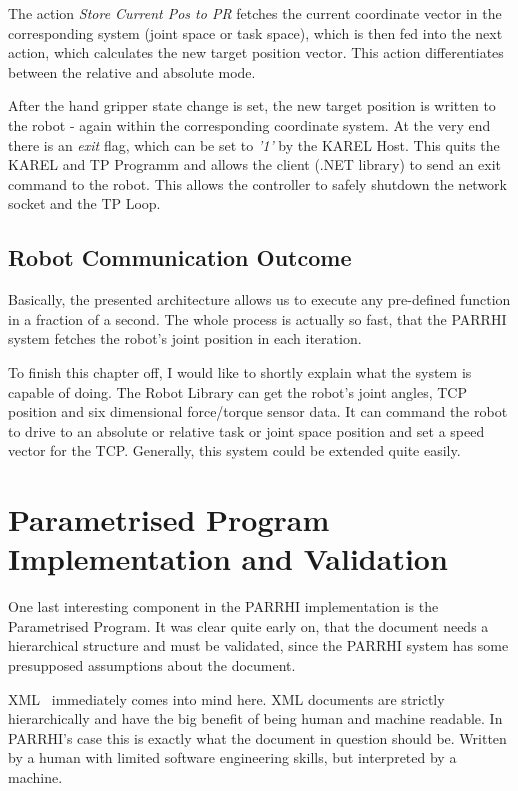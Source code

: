 The action \textit{Store Current Pos to PR} fetches the current coordinate vector in the corresponding system (joint space or task space), which is then fed into the next action, which calculates the new target position vector. This action differentiates between the relative and absolute mode. 

After the hand gripper state change is set, the new target position is written to the robot - again within the corresponding coordinate system. At the very end there is an \textit{exit} flag, which can be set to \textit{'1'} by the KAREL Host. This quits the KAREL and TP Programm and allows the client (.NET library) to send an exit command to the robot. This allows the controller to safely shutdown the network socket and the TP Loop. 

\subsection{Robot Communication Outcome}

Basically, the presented architecture allows us to execute any pre-defined function in a fraction of a second. The whole process is actually so fast, that the PARRHI system fetches the robot's joint position in each iteration.

To finish this chapter off, I would like to shortly explain what the system is capable of doing. The Robot Library can get the robot's joint angles, TCP position and six dimensional force/torque sensor data. It can command the robot to drive to an absolute or relative task or joint space position and set a speed vector for the TCP. Generally, this system could be extended quite easily.

\section{Parametrised Program Implementation and Validation}
One last interesting component in the PARRHI implementation is the Parametrised Program. It was clear quite early on, that the document needs a hierarchical structure and must be validated, since the PARRHI system has some presupposed assumptions about the document.  

XML~\cite{xmlW3C} immediately comes into mind here. XML documents are strictly hierarchically and have the big benefit of being human and machine readable. In PARRHI's case this is exactly what the document in question should be. Written by a human with limited software engineering skills, but interpreted by a machine.


